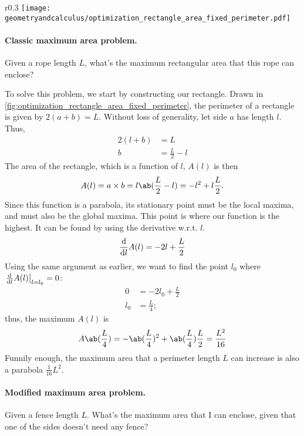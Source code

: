 \begin{wrapfigure}{r}{0.3\textwidth}
	\centering
	\texttt{[image: geometryandcalculus/optimization\_rectangle\_area\_fixed\_perimeter.pdf]}
	\caption{A rectangle for optimization}
	\label{fig:optimization_rectangle_area_fixed_perimeter}
\end{wrapfigure}
\paragraph{Classic maximum area problem.} Given a rope length $L$, what's the maximum rectangular area that this rope can enclose?

To solve this problem, we start by constructing our rectangle. Drawn in \cref{fig:optimization_rectangle_area_fixed_perimeter}, the perimeter of a rectangle is given by $2(a + b) = L$. Without loss of generality, let side $a$ has length $l$. Thus,
\begin{align}
	2(l + b) &= L \\
	b &= \frac{L}{2} - l
\end{align}
The area of the rectangle, which is a function of $l$, $A(l)$ is then
\begin{equation}
	A(l) = a \times b = l\ab(\frac{L}{2} - l) = -l^2 + l\frac{L}{2}.
\end{equation}
Since this function is a parabola, its stationary point must be the local maxima, and must also be the global maxima. This point is where our function is the highest. It can be found by using the derivative w.r.t. $l$.
\begin{equation}
	\odv*{A(l)}{l} = -2l + \frac{L}{2}
\end{equation}
Using the same argument as earlier, we want to find the point $l_0$ where $\odv*{A(l)}{l}_{l = l_0} = 0$:
\begin{align}
	0 &= - 2l_0 + \frac{L}{2} \\
	l_0 &= \frac{L}{4};
\end{align}
thus, the maximum $A(l)$ is
\begin{equation}
	A\ab(\frac{L}{4}) = -\ab(\frac{L}{4})^2 + \ab(\frac{L}{4})\frac{L}{2} = \frac{L^2}{16}
\end{equation}
Funnily enough, the maximum area that a perimeter length $L$ can increase is also a parabola $\frac{1}{16}L^2$.

\paragraph{Modified maximum area problem.} Given a fence length $L$. What's the maximum area that I can enclose, given that one of the sides doesn't need any fence?

